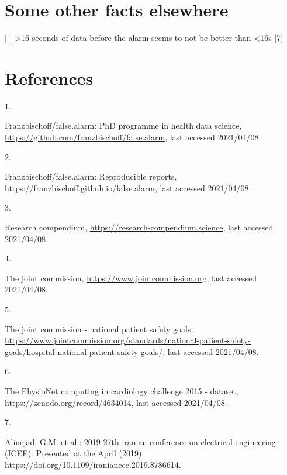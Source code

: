 \documentclass[
]{article}
\newlength{\cslhangindent}
\newlength{\csllabelwidth}
\newenvironment{CSLReferences}[2] %
 {%
  \setlength{\parindent}{0pt}
  \ifodd #1 \everypar{\setlength{\hangindent}{\cslhangindent}}\ignorespaces\fi
  \ifnum #2 > 0
  \setlength{\parskip}{#2\baselineskip}
  \fi
 }%
 {}
\newcommand{\CSLLeftMargin}[1]{\parbox[t]{\csllabelwidth}{#1}}
\newcommand{\CSLRightInline}[1]{\parbox[t]{\linewidth - \csllabelwidth}{#1}\break}
\begin{document}
\hypertarget{some-other-facts-elsewhere}{%
\section{Some other facts elsewhere}\label{some-other-facts-elsewhere}}

{[} {]} \textgreater16 seconds of data before the alarm seems to not be
better than \textless16s {[}\protect\hyperlink{ref-alinejad2019}{7}{]}

\hypertarget{references}{%
\section*{References}\label{references}}

\hypertarget{refs}{}
\begin{CSLReferences}{0}{0}
\leavevmode{}%
\CSLLeftMargin{1. }
\CSLRightInline{Franzbischoff/false.alarm: PhD programme in health data
science, \url{https://github.com/franzbischoff/false.alarm}, last
accessed 2021/04/08.}

\leavevmode{}%
\CSLLeftMargin{2. }
\CSLRightInline{Franzbischoff/false.alarm: Reproducible reports,
\url{https://franzbischoff.github.io/false.alarm}, last accessed
2021/04/08.}

\leavevmode{}%
\CSLLeftMargin{3. }
\CSLRightInline{Research compendium,
\url{https://research-compendium.science}, last accessed 2021/04/08.}

\leavevmode{}%
\CSLLeftMargin{4. }
\CSLRightInline{The joint commission,
\url{https://www.jointcommission.org}, last accessed 2021/04/08.}

\leavevmode{}%
\CSLLeftMargin{5. }
\CSLRightInline{The joint commission - national patient safety goals,
\url{https://www.jointcommission.org/standards/national-patient-safety-goals/hospital-national-patient-safety-goals/},
last accessed 2021/04/08.}

\leavevmode{}%
\CSLLeftMargin{6. }
\CSLRightInline{The PhysioNet computing in cardiology challenge 2015 -
dataset, \url{https://zenodo.org/record/4634014}, last accessed
2021/04/08.}

\leavevmode{}%
\CSLLeftMargin{7. }
\CSLRightInline{Alinejad, G.M. et al.: 2019 27th iranian conference on
electrical engineering (ICEE). Presented at the April (2019).
\url{https://doi.org/10.1109/iraniancee.2019.8786614}.}


\end{CSLReferences}
\end{document}
